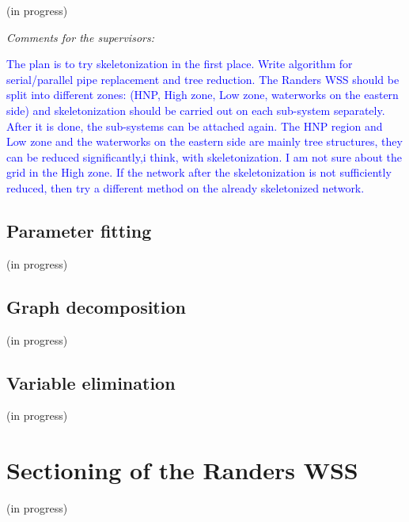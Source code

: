 (in progress)

\emph{Comments for the supervisors:}

\textcolor{blue}{The plan is to try skeletonization in the first place. Write algorithm for serial/parallel pipe replacement and tree reduction. The Randers WSS should be split into different zones: (HNP, High zone, Low zone,  waterworks on the eastern side) and skeletonization should be carried out on each sub-system separately. After it is done, the sub-systems can be attached again. The HNP region and Low zone and the waterworks on the eastern side are mainly tree structures, they can be reduced significantly,i think, with skeletonization. I am not sure about the grid in the High zone. If the network after the skeletonization is not sufficiently reduced, then try a different method on the already skeletonized network.}


\subsection{Parameter fitting}
\label{parameter_fitting}

(in progress)

\subsection{Graph decomposition}
\label{graph_decomposition}

(in progress)

\subsection{Variable elimination}
\label{variable_elimination}

(in progress)

\section{Sectioning of the Randers WSS}
\label{sectioning_of_the_randers_WSS}

(in progress)

















